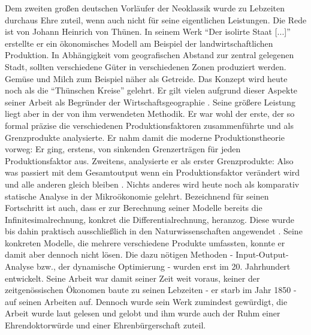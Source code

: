 Dem zweiten großen deutschen Vorläufer der Neoklassik wurde zu Lebzeiten durchaus Ehre zuteil, wenn auch nicht für seine eigentlichen Leistungen. Die Rede ist von Johann Heinrich von Thünen. In seinem Werk "`Der isolirte Staat [...]"' \textcite{Thunen1826} erstellte er ein ökonomisches Modell am Beispiel der landwirtschaftlichen Produktion. In Abhängigkeit vom geografischen Abstand zur zentral gelegenen Stadt, sollten verschiedene Güter in verschiedenen Zonen produziert werden. Gemüse und Milch zum Beispiel näher als Getreide. Das Konzept wird heute noch als die "`Thünschen Kreise"' gelehrt. Er gilt vielen aufgrund dieser Aspekte seiner Arbeit als Begründer der Wirtschaftsgeographie \parencite[S. 283]{Kurz2009}. Seine größere Leistung liegt aber in der von ihm verwendeten Methodik. Er war wohl der erste, der so formal präzise die verschiedenen Produktionsfaktoren zusammenführte und als Grenzprodukte analysierte. Er nahm damit die moderne Produktionstheorie vorweg: Er ging, erstens, von sinkenden Grenzerträgen für jeden Produktionsfaktor aus. Zweitens, analysierte er als erster Grenzprodukte: Also was passiert mit dem Gesamtoutput wenn ein Produktionsfaktor verändert wird und alle anderen gleich bleiben \parencite[S. 282]{Rosner2012}. Nichts anderes wird heute noch als komparativ statische Analyse in der Mikroökonomie gelehrt. Bezeichnend für seinen Fortschritt ist auch, dass er zur Berechnung seiner Modelle bereits die Infinitesimalrechnung, konkret die Differentialrechnung, heranzog. Diese wurde bis dahin praktisch ausschließlich in den Naturwissenschaften angewendet \parencite[S. 202]{Ekelund2002}. Seine konkreten Modelle, die mehrere verschiedene Produkte umfassten, konnte er damit aber dennoch nicht lösen. Die dazu nötigen Methoden - Input-Output-Analyse bzw., der dynamische Optimierung - wurden erst im 20. Jahrhundert entwickelt. Seine Arbeit war damit seiner Zeit weit voraus, keiner der zeitgenössischen Ökonomen baute zu seinen Lebzeiten - er starb im Jahr 1850 - auf seinen Arbeiten auf. Dennoch wurde sein Werk zumindest gewürdigt, die Arbeit wurde laut \textcite[S. 283]{Rosner2012} gelesen und gelobt und ihm wurde auch der Ruhm einer Ehrendoktorwürde und einer Ehrenbürgerschaft zuteil.

